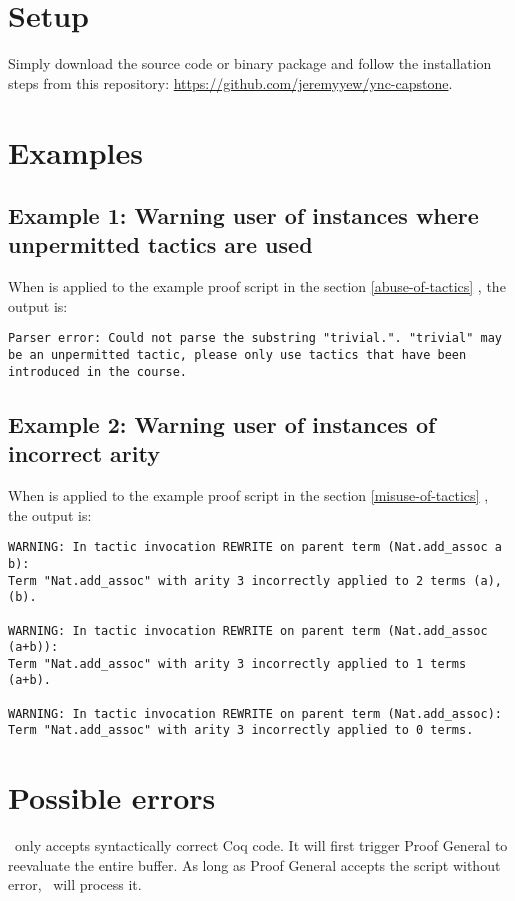 \section{Setup}
Simply download the source code or binary package and follow the installation steps from this repository: \url{https://github.com/jeremyyew/ync-capstone}.

\section{Examples}

\subsection{Example 1: Warning user of instances where unpermitted tactics are used}
\label{example-1}
When  is applied to the example proof script in the section \ref{abuse-of-tactics} , the output is:
\begin{verbatim}
Parser error: Could not parse the substring "trivial.". "trivial" may be an unpermitted tactic, please only use tactics that have been introduced in the course.
\end{verbatim}

\subsection{Example 2: Warning user of instances of incorrect arity}
\label{example-2}
When  is applied to the example proof script in the section \ref{misuse-of-tactics} , the output is:

\begin{verbatim}
WARNING: In tactic invocation REWRITE on parent term (Nat.add_assoc a b):
Term "Nat.add_assoc" with arity 3 incorrectly applied to 2 terms (a),(b).

WARNING: In tactic invocation REWRITE on parent term (Nat.add_assoc (a+b)):
Term "Nat.add_assoc" with arity 3 incorrectly applied to 1 terms (a+b).

WARNING: In tactic invocation REWRITE on parent term (Nat.add_assoc):
Term "Nat.add_assoc" with arity 3 incorrectly applied to 0 terms.
\end{verbatim}

\section{Possible errors}
\ only accepts syntactically correct Coq code. It will first trigger Proof General to reevaluate the entire buffer. As long as Proof General accepts the script without error, \ will process it.


